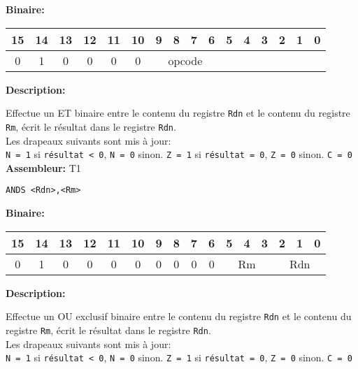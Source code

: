 \textbf{Binaire:}\\

\begin{tabular}{| c c c c c c c c c c c c c c c c |}
\hline
15 & 14 & 13 & 12 & 11 & 10 & \multicolumn{1}{|c}{9} & 8 & 7 & 6 & \multicolumn{1}{|c}{5} & 4 & 3 & 2 & 1 & 0 \\
\hline
0 & 1 & 0 & 0 & 0 & 0 & \multicolumn{4}{|c}{opcode} & \multicolumn{6}{|c|}{} \\
\hline
\end{tabular}


\textbf{Description: }

Effectue un ET binaire entre le contenu du registre \texttt{Rdn} et le contenu du registre \texttt{Rm}, écrit le résultat dans le registre \texttt{Rdn}.\\
Les drapeaux suivants sont mis à jour:\\
\texttt{N = 1} si \texttt{résultat < 0}, \texttt{N = 0} sinon.
\texttt{Z = 1} si \texttt{résultat = 0}, \texttt{Z = 0} sinon.
\texttt{C = 0}\\

\textbf{Assembleur:} T1

\begin{lstlisting}
ANDS <Rdn>,<Rm>
\end{lstlisting}

\textbf{Binaire:}\\

\begin{tabular}{| c c c c c c c c c c c c c c c c |}
\hline
15 & 14 & 13 & 12 & 11 & 10 & \multicolumn{1}{|c}{9} & 8 & 7 & 6 & \multicolumn{1}{|c}{5} & 4 & 3 & \multicolumn{1}{|c}{2} & 1 & 0 \\
\hline
0 & 1 & 0 & 0 & 0 & 0 & \multicolumn{1}{|c}{0} & 0 & 0 & 0 & \multicolumn{3}{|c}{Rm} & \multicolumn{3}{|c|}{Rdn} \\
\hline
\end{tabular}



\textbf{Description: }

Effectue un OU exclusif binaire entre le contenu du registre \texttt{Rdn} et le contenu du registre \texttt{Rm}, écrit le résultat dans le registre \texttt{Rdn}.\\
Les drapeaux suivants sont mis à jour:\\
\texttt{N = 1} si \texttt{résultat < 0}, \texttt{N = 0} sinon.                                                                    
\texttt{Z = 1} si \texttt{résultat = 0}, \texttt{Z = 0} sinon.
\texttt{C = 0}\\

